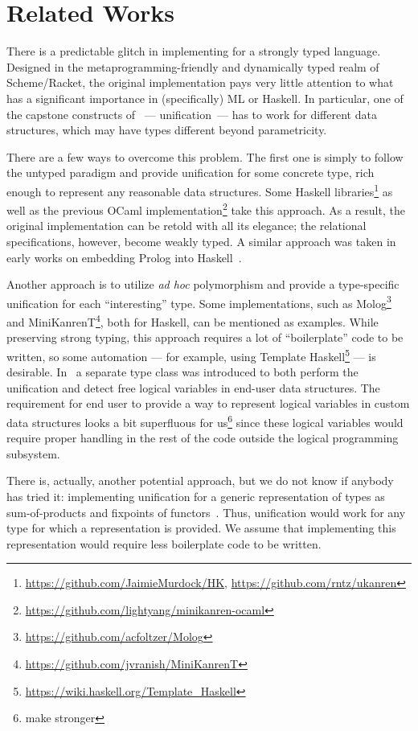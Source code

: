\section{Related Works}
\label{sec:relworks}

There is a predictable glitch in implementing \miniKanren for a strongly typed language.
Designed in the metaprogramming-friendly and dynamically typed realm of Scheme/Racket, the original
\miniKanren implementation pays very little attention to what has a significant importance in (specifically)
ML or Haskell. In particular, one of the capstone constructs of \miniKanren~--- unification~--- has to work for
different data structures, which may have types different beyond parametricity.

There are a few ways to overcome this problem. The first one is simply to follow the untyped paradigm and
provide unification for some concrete type, rich enough to represent any reasonable data structures.
Some Haskell \miniKanren libraries\footnote{\url{https://github.com/JaimieMurdock/HK}, \url{https://github.com/rntz/ukanren}}
as well as the previous OCaml implementation\footnote{\url{https://github.com/lightyang/minikanren-ocaml}} take this approach.
As a result, the original implementation can be retold with all its elegance; the relational specifications, however,
become weakly typed. A similar approach was taken in early works on embedding Prolog into Haskell~\cite{PrologInHaskell}.

Another approach is to utilize \emph{ad hoc} polymorphism and provide a type-specific unification for each ``interesting'' type.
Some \miniKanren implementations, such as Molog\footnote{\url{https://github.com/acfoltzer/Molog}} and
MiniKanrenT\footnote{\url{https://github.com/jvranish/MiniKanrenT}}, both for Haskell, can be mentioned as examples.
While preserving strong typing, this approach requires a lot of ``boilerplate''
code to be written, so some automation --- for example, using Template Haskell\footnote{\url{https://wiki.haskell.org/Template_Haskell}} ---
is desirable. In~\cite{TypedLogicalVariables} a separate type class was introduced to both perform the unification
and detect free logical variables in end-user data structures. The requirement for end user to provide a way to represent
logical variables in custom data structures looks a bit superfluous for us\footnote{make stronger} since these logical variables would require proper
handling in the rest of the code outside the logical programming subsystem.

There is, actually, another potential approach, but we do not know if anybody has tried
it: implementing unification for a generic representation of types as sum-of-products and fixpoints of
functors~\cite{InstantGenerics, ALaCarte}. Thus, unification would work for any type for which a representation
is provided. We assume that implementing this representation would require less boilerplate code to be written.

